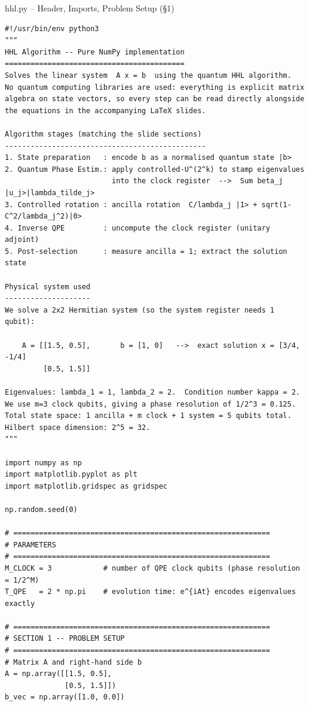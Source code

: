 \documentclass{beamer}
\begin{document}
\begin{frame}{hhl.py -- Header, Imports, Problem Setup (\S1)}
\begin{lstlisting}
#!/usr/bin/env python3
"""
HHL Algorithm -- Pure NumPy implementation
==========================================
Solves the linear system  A x = b  using the quantum HHL algorithm.
No quantum computing libraries are used: everything is explicit matrix
algebra on state vectors, so every step can be read directly alongside
the equations in the accompanying LaTeX slides.

Algorithm stages (matching the slide sections)
-----------------------------------------------
1. State preparation   : encode b as a normalised quantum state |b>
2. Quantum Phase Estim.: apply controlled-U^(2^k) to stamp eigenvalues
                         into the clock register  -->  Sum beta_j |u_j>|lambda_tilde_j>
3. Controlled rotation : ancilla rotation  C/lambda_j |1> + sqrt(1-C^2/lambda_j^2)|0>
4. Inverse QPE         : uncompute the clock register (unitary adjoint)
5. Post-selection      : measure ancilla = 1; extract the solution state

Physical system used
--------------------
We solve a 2x2 Hermitian system (so the system register needs 1 qubit):

    A = [[1.5, 0.5],       b = [1, 0]   -->  exact solution x = [3/4, -1/4]
         [0.5, 1.5]]

Eigenvalues: lambda_1 = 1, lambda_2 = 2.  Condition number kappa = 2.
We use m=3 clock qubits, giving a phase resolution of 1/2^3 = 0.125.
Total state space: 1 ancilla + m clock + 1 system = 5 qubits total.
Hilbert space dimension: 2^5 = 32.
"""

import numpy as np
import matplotlib.pyplot as plt
import matplotlib.gridspec as gridspec

np.random.seed(0)

# ============================================================
# PARAMETERS
# ============================================================
M_CLOCK = 3            # number of QPE clock qubits (phase resolution = 1/2^M)
T_QPE   = 2 * np.pi    # evolution time: e^{iAt} encodes eigenvalues exactly

# ============================================================
# SECTION 1 -- PROBLEM SETUP
# ============================================================
# Matrix A and right-hand side b
A = np.array([[1.5, 0.5],
              [0.5, 1.5]])
b_vec = np.array([1.0, 0.0])


\end{lstlisting}
\end{frame}
\end{document}
